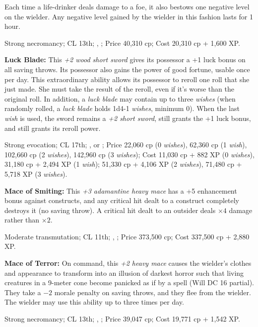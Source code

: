 Each time a life-drinker deals damage to a foe, it also bestows one negative level on the wielder. Any negative level gained by the wielder in this fashion lasts for 1 hour.

Strong necromancy; CL 13th; , ; Price 40,310 cp; Cost 20,310 cp + 1,600 XP.

\textbf{Luck Blade:} This \emph{+2 wood short sword} gives its possessor a +1 luck bonus on all saving throws. Its possessor also gains the power of good fortune, usable once per day. This extraordinary ability allows its possessor to reroll one roll that she just made. She must take the result of the reroll, even if it's worse than the original roll. In addition, a \emph{luck blade} may contain up to three \emph{wishes} (when randomly rolled, a \emph{luck blade} holds 1d4-1 \emph{wishes}, minimum 0). When the last \emph{wish} is used, the sword remains a \emph{+2 short sword}, still grants the +1 luck bonus, and still grants its reroll power.

Strong evocation; CL 17th; ,  or ; Price 22,060 cp (0 \emph{wishes}), 62,360 cp (1 \emph{wish}), 102,660 cp (2 \emph{wishes}), 142,960 cp (3 \emph{wishes}); Cost 11,030 cp + 882 XP (0 \emph{wishes}), 31,180 cp + 2,494 XP (1 \emph{wish}); 51,330 cp + 4,106 XP (2 \emph{wishes}), 71,480 cp + 5,718 XP (3 \emph{wishes}).

\textbf{Mace of Smiting:} This \emph{+3 adamantine heavy mace} has a +5 enhancement bonus against constructs, and any critical hit dealt to a construct completely destroys it (no saving throw). A critical hit dealt to an outsider deals $\times4$ damage rather than $\times2$.

Moderate transmutation; CL 11th; , ; Price 373,500 cp; Cost 337,500 cp + 2,880 XP.

\textbf{Mace of Terror:} On command, this \emph{+2 heavy mace} causes the wielder's clothes and appearance to transform into an illusion of darkest horror such that living creatures in a 9-meter cone become panicked as if by a  spell (Will DC 16 partial). They take a $-2$ morale penalty on saving throws, and they flee from the wielder. The wielder may use this ability up to three times per day.

Strong necromancy; CL 13th; , ; Price 39,047 cp; Cost 19,771 cp + 1,542 XP.

